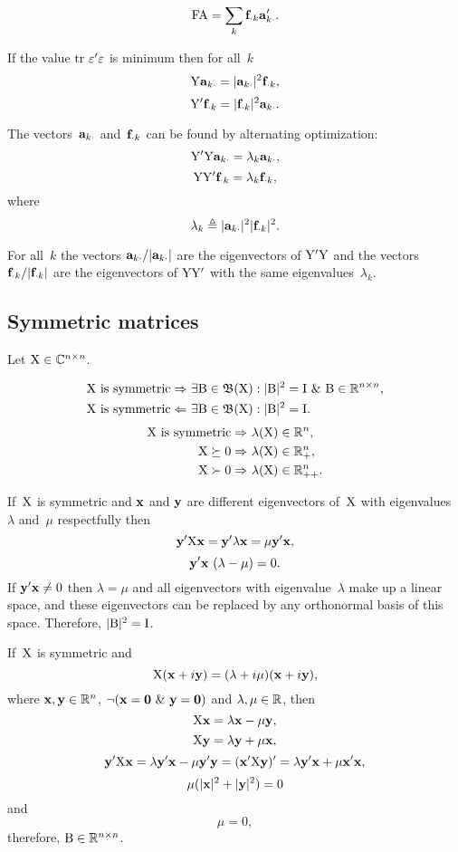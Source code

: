 \documentclass[10pt,a4paper]{article}
\theoremstyle{plain} \newtheorem{Lem}{Lemma}
\begin{document}
$$ \mathrm F \mathrm A = \sum_k \mathbf f_{\cdot k} \mathbf a_{k \cdot}'. $$

If the value $\mathrm {tr} \  \mathrm \varepsilon' \mathrm \varepsilon$ is minimum then for all~$k$
$$\mathrm Y \mathbf a_{k \cdot} = |\mathbf a_{k \cdot}|^2 \mathbf f_{\cdot k}, $$
$$\mathrm Y' \mathbf f_{\cdot k} = |\mathbf f_{\cdot k}|^2 \mathbf a_{k \cdot}.$$

The vectors~$\mathbf a_{k \cdot}$ and~$\mathbf f_{\cdot k}$ can be found by alternating optimization:
$$ \mathrm Y' \mathrm Y \mathbf a_{k \cdot} = \lambda_k \mathbf a_{k \cdot}, $$
$$ \mathrm Y \mathrm Y' \mathbf f_{\cdot k} = \lambda_k \mathbf f_{\cdot k}, $$
where
$$ \lambda_k \triangleq |\mathbf a_{k \cdot}|^2 |\mathbf f_{\cdot k}|^2. $$

For all~$k$
the vectors $\mathbf a_{k \cdot}/|\mathbf a_{k \cdot}|$ are the eigenvectors of $\mathrm Y' \mathrm Y$ 
and 
the vectors $\mathbf f_{\cdot k}/|\mathbf f_{\cdot k}|$ are the eigenvectors of $\mathrm Y \mathrm Y'$ 
with the same eigenvalues~$\lambda_k$.


\subsection{Symmetric matrices}

Let $\mathrm X \in \mathbb C^{n \times n}$.

\begin{align*}
  \mathrm X \text{ is symmetric} \Rightarrow  & \ \exists \mathrm B \in \mathfrak B(\mathrm X) : |\mathrm B|^2 = \mathrm I \ \& \  \mathrm B \in \mathbb R^{n \times n}, \\
  \mathrm X \text{ is symmetric} \Leftarrow& \ \exists \mathrm B \in \mathfrak B(\mathrm X) : |\mathrm B|^2 = \mathrm I.
\end{align*} 
\begin{align*}
 \mathrm X \text{ is symmetric} \Rightarrow& \ \lambda(\mathrm X) \in \mathbb R^n, \\
 \mathrm X \succeq 0 \Rightarrow& \ \lambda(\mathrm X) \in \mathbb R_+^n, \\
 \mathrm X \succ   0 \Rightarrow& \ \lambda(\mathrm X) \in \mathbb R_{++}^n. 
\end{align*} 

\proof
{ 
  If~$\mathrm X$ is symmetric and $\mathbf x$ and $\mathbf y$ are different eigenvectors of~$\mathrm X$ with eigenvalues~$\lambda$ and~$\mu$ respectfully 
  then
  $$ \mathbf y' \mathrm X \mathbf x = \mathbf y' \lambda \mathbf x = \mu \mathbf y' \mathbf x, $$
  $$ \mathbf y' \mathbf x \ (\lambda - \mu) = 0. $$ 
  If $\mathbf y' \mathbf x \ne 0$ then $\lambda = \mu$ and all eigenvectors with eigenvalue~$\lambda$ make up a linear space, and these eigenvectors can be replaced by any orthonormal basis of this space.
  Therefore, $|\mathrm B|^2 = \mathrm I$.

  If~$\mathrm X$ is symmetric and
  $$ \mathrm X (\mathbf x + i \mathbf y) = (\lambda + i \mu) (\mathbf x + i \mathbf y), $$
  where $\mathbf x, \mathbf y \in \mathbb R^n$, 
  $\neg (\mathbf x = \mathbf 0 \ \& \  \mathbf y = \mathbf 0)$ and $\lambda, \mu \in \mathbb R$,
  then
  $$ \mathrm X \mathbf x = \lambda \mathbf x - \mu \mathbf y, $$
  $$ \mathrm X \mathbf y = \lambda \mathbf y + \mu \mathbf x, $$
  $$ \mathbf y' \mathrm X \mathbf x = \lambda \mathbf y' \mathbf x - \mu \mathbf y' \mathbf y = (\mathbf x' \mathrm X \mathbf y)' = \lambda \mathbf y' \mathbf x + \mu \mathbf x' \mathbf x, $$
  $$ \mu (|\mathbf x|^2 + |\mathbf y|^2) = 0 $$
  and
  $$ \mu = 0, $$
  therefore, $\mathrm B \in \mathbb R^{n \times n}$.  
}
\end{document}

